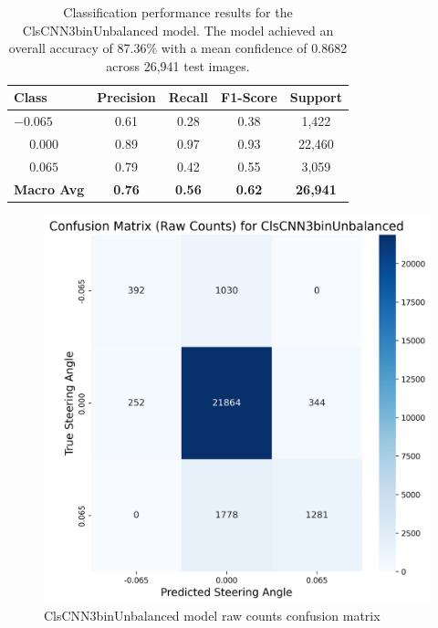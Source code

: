\begin{table}[htbp]
\centering
\begin{tabular}{@{}lcccc@{}}
\toprule
\textbf{Class} & \textbf{Precision} & \textbf{Recall} & \textbf{F1-Score} & \textbf{Support} \\
\midrule
$-0.065$ & 0.61 & 0.28 & 0.38 & 1,422 \\
$\phantom{-}0.000$ & 0.89 & 0.97 & 0.93 & 22,460 \\
$\phantom{-}0.065$ & 0.79 & 0.42 & 0.55 & 3,059 \\
\midrule
\textbf{Macro Avg} & \textbf{0.76} & \textbf{0.56} & \textbf{0.62} & \textbf{26,941} \\
\bottomrule
\end{tabular}
\caption{Classification performance results for the ClsCNN3binUnbalanced model. The model achieved an overall accuracy of 87.36\% with a mean confidence of 0.8682 across 26,941 test images.}
\label{tab:clf_report_ClsCNN3binUnbalanced}
\end{table}

\begin{figure}[H]
\centering
\includegraphics[width=0.65\linewidth]{Figures/Results/cm_raw_ClsCNN3binUnbalanced.png}
\caption{ClsCNN3binUnbalanced model raw counts confusion matrix}
\label{fig:cm_raw_ClsCNN3binUnbalanced}
\end{figure}

